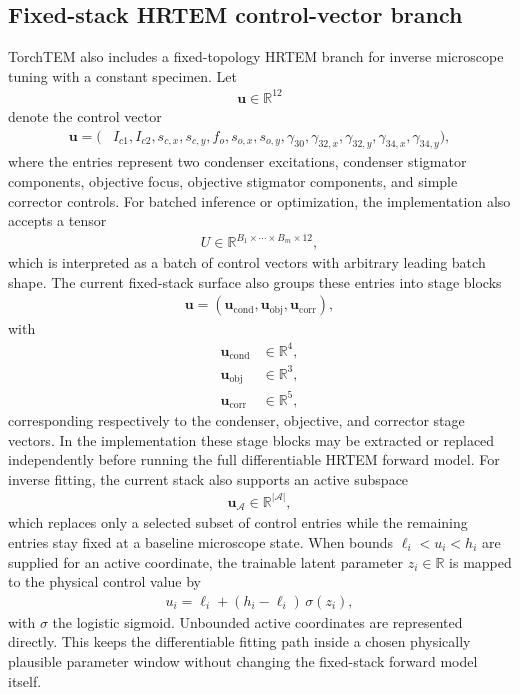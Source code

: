 \documentclass[11pt]{article}
\begin{document}
\subsection{Fixed-stack HRTEM control-vector branch}
TorchTEM also includes a fixed-topology HRTEM branch for inverse microscope tuning with
a constant specimen.  Let
\begin{align}
  \mathbf{u}\in\mathbb{R}^{12}
\end{align}
denote the control vector
\begin{align}
  \mathbf{u} =
  (&I_{c1}, I_{c2}, s_{c,x}, s_{c,y}, f_o, s_{o,x}, s_{o,y}, \gamma_{30},
    \gamma_{32,x}, \gamma_{32,y}, \gamma_{34,x}, \gamma_{34,y}),
\end{align}
where the entries represent two condenser excitations, condenser stigmator components,
objective focus, objective stigmator components, and simple corrector controls.
For batched inference or optimization, the implementation also accepts a tensor
\begin{align}
  U \in \mathbb{R}^{B_1\times\cdots\times B_m\times 12},
\end{align}
which is interpreted as a batch of control vectors with arbitrary leading batch shape.
The current fixed-stack surface also groups these entries into stage blocks
\begin{align}
  \mathbf{u}
  =
  \left(
    \mathbf{u}_{\mathrm{cond}},
    \mathbf{u}_{\mathrm{obj}},
    \mathbf{u}_{\mathrm{corr}}
  \right),
\end{align}
with
\begin{align}
  \mathbf{u}_{\mathrm{cond}} &\in \mathbb{R}^{4}, \\
  \mathbf{u}_{\mathrm{obj}} &\in \mathbb{R}^{3}, \\
  \mathbf{u}_{\mathrm{corr}} &\in \mathbb{R}^{5},
\end{align}
corresponding respectively to the condenser, objective, and corrector stage vectors.
In the implementation these stage blocks may be extracted or replaced independently
before running the full differentiable HRTEM forward model.
For inverse fitting, the current stack also supports an active subspace
\begin{align}
  \mathbf{u}_{\mathcal{A}} \in \mathbb{R}^{|\mathcal{A}|},
\end{align}
which replaces only a selected subset of control entries while the remaining entries
stay fixed at a baseline microscope state.  When bounds
\(
  \ell_i < u_i < h_i
\)
are supplied for an active coordinate, the trainable latent parameter
\(
  z_i \in \mathbb{R}
\)
is mapped to the physical control value by
\begin{align}
  u_i = \ell_i + (h_i - \ell_i)\,\sigma(z_i),
\end{align}
with \(\sigma\) the logistic sigmoid.  Unbounded active coordinates are represented
directly.  This keeps the differentiable fitting path inside a chosen physically
plausible parameter window without changing the fixed-stack forward model itself.
\end{document}
